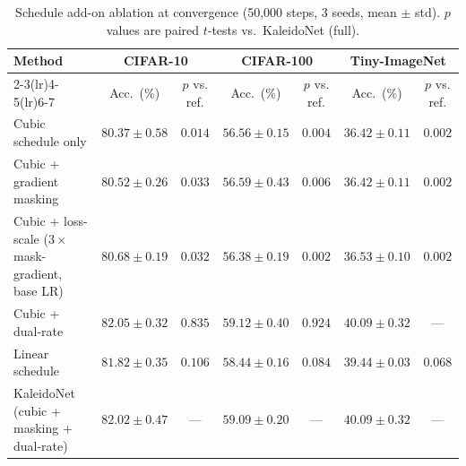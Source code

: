 \begin{table}[t]
\centering
\caption{Schedule add-on ablation at convergence (50{,}000 steps, 3 seeds, mean $\pm$ std). $p$ values are paired $t$-tests vs.\ KaleidoNet (full).}
\label{tab:ablation_schedule}
\small
\setlength{\tabcolsep}{4pt}
\begin{tabular}{lcccccc}
\toprule
\textbf{Method} & \multicolumn{2}{c}{\textbf{CIFAR-10}} & \multicolumn{2}{c}{\textbf{CIFAR-100}} & \multicolumn{2}{c}{\textbf{Tiny-ImageNet}} \\
\cmidrule(lr){2-3}\cmidrule(lr){4-5}\cmidrule(lr){6-7}
  & Acc.\ (\%) & $p$ vs. ref. & Acc.\ (\%) & $p$ vs. ref. & Acc.\ (\%) & $p$ vs. ref. \\
\midrule
Cubic schedule only & $80.37\pm0.58$ & $0.014$ & $56.56\pm0.15$ & $0.004$ & $36.42\pm0.11$ & $0.002$ \\
Cubic + gradient masking & $80.52\pm0.26$ & $0.033$ & $56.59\pm0.43$ & $0.006$ & $36.42\pm0.11$ & $0.002$ \\
Cubic + loss-scale ($3\times$ mask-gradient, base LR) & $80.68\pm0.19$ & $0.032$ & $56.38\pm0.19$ & $0.002$ & $36.53\pm0.10$ & $0.002$ \\
Cubic + dual-rate & $82.05\pm0.32$ & $0.835$ & $59.12\pm0.40$ & $0.924$ & $40.09\pm0.32$ & --- \\
Linear schedule & $81.82\pm0.35$ & $0.106$ & $58.44\pm0.16$ & $0.084$ & $39.44\pm0.03$ & $0.068$ \\
KaleidoNet (cubic + masking + dual-rate) & $82.02\pm0.47$ & --- & $59.09\pm0.20$ & --- & $40.09\pm0.32$ & --- \\
\bottomrule
\end{tabular}
\end{table}

